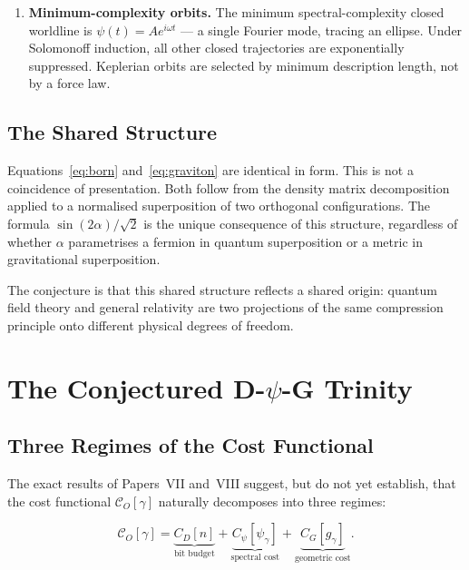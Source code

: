 \documentclass[11pt]{article}
\begin{document}
\begin{enumerate}
  \item \textbf{Minimum-complexity orbits.}
        The minimum spectral-complexity closed worldline is
        $\psi(t) = Ae^{i\omega t}$ --- a single Fourier mode, tracing
        an ellipse.
        Under Solomonoff induction, all other closed trajectories are
        exponentially suppressed.
        Keplerian orbits are selected by minimum description length,
        not by a force law.
\end{enumerate}

\subsection{The Shared Structure}

Equations~\eqref{eq:born} and~\eqref{eq:graviton} are identical in
form.
This is not a coincidence of presentation.
Both follow from the density matrix decomposition applied to a
normalised superposition of two orthogonal configurations.
The formula $\sin(2\alpha)/\sqrt{2}$ is the unique consequence of
this structure, regardless of whether $\alpha$ parametrises a fermion
in quantum superposition or a metric in gravitational superposition.

The conjecture is that this shared structure reflects a shared origin:
quantum field theory and general relativity are two projections of the
same compression principle onto different physical degrees of freedom.

\section{The Conjectured D-$\psi$-G Trinity}
\label{sec:trinity}

\subsection{Three Regimes of the Cost Functional}

The exact results of Papers~VII and~VIII suggest, but do not yet
establish, that the cost functional $\mathcal{C}_O[\gamma]$ naturally
decomposes into three regimes:

\begin{equation}
\mathcal{C}_O[\gamma]
= \underbrace{C_D[n]}_{\text{bit budget}}
+ \underbrace{C_\psi[\psi_\gamma]}_{\text{spectral cost}}
+ \underbrace{C_G[g_\gamma]}_{\text{geometric cost}}.
\label{eq:decomp}
\end{equation}
\end{document}
